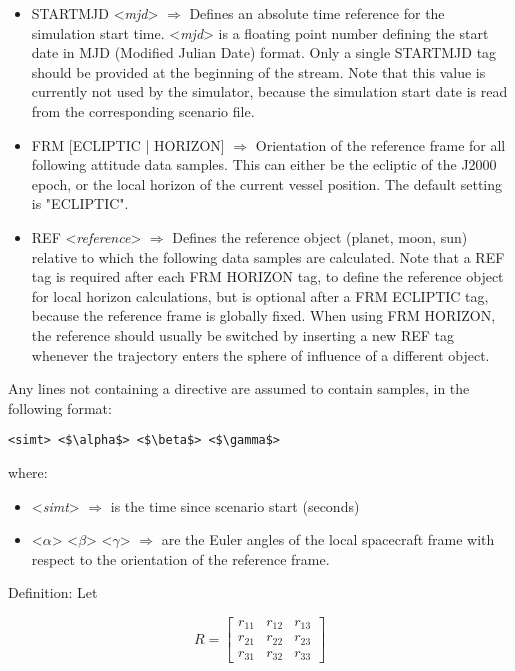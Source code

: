 \documentclass[Orbiter Technical Reference.tex]{subfiles}
\begin{document}
\begin{itemize}
\item STARTMJD <\textit{mjd}> $\Rightarrow$ Defines an absolute time reference for the simulation start time. <\textit{mjd}> is a floating point number defining the start date in MJD (Modified Julian Date) format. Only a single STARTMJD tag should be provided at the beginning of the stream. Note that this value is currently not used by the simulator, because the simulation start date is read from the corresponding scenario file.
\item FRM [ECLIPTIC | HORIZON] $\Rightarrow$ Orientation of the reference frame for all following attitude data samples. This can either be the ecliptic of the J2000 epoch, or the local horizon of the current vessel position. The default setting is "ECLIPTIC".
\item REF <\textit{reference}> $\Rightarrow$ Defines the reference object (planet, moon, sun) relative to which the following data samples are calculated. Note that a REF tag is required after each FRM HORIZON tag, to define the reference object for local horizon calculations, but is optional after a FRM ECLIPTIC tag, because the reference frame is globally fixed.
When using FRM HORIZON, the reference should usually be switched by inserting a new REF tag whenever the trajectory enters the sphere of influence of a different object.
\end{itemize}

\noindent
Any lines not containing a directive are assumed to contain samples, in the following format:

\begin{lstlisting}[language=OSFS,mathescape=true]
<simt> <$\alpha$> <$\beta$> <$\gamma$>
\end{lstlisting}

\noindent
where:

\begin{itemize}
\item <\textit{simt}> $\Rightarrow$ is the time since scenario start (seconds)
\item <$\alpha$> <$\beta$> <$\gamma$> $\Rightarrow$ are the Euler angles of the local spacecraft frame with respect to the orientation of the reference frame.
\end{itemize}

\noindent
Definition: Let

\[ R = 
\begin{bmatrix}
r_{11} & r_{12} & r_{13}\\
r_{21} & r_{22} & r_{23}\\
r_{31} & r_{32} & r_{33}
\end{bmatrix}
\]
\end{document}
